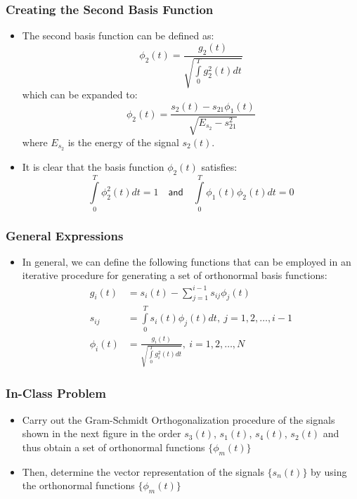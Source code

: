 \documentclass[10pt]{beamer}
\begin{document}
\frame
{
  \frametitle{Creating the Second Basis Function}

    \begin{itemize}
        \item The second basis function can be defined as:
        \begin{equation}
            \phi_2(t)=\frac{g_2(t)}{\sqrt{\int\limits_{0}^{T}g_2^2(t)dt}}
        \end{equation}
        which can be expanded to:
        \begin{equation}
            \phi_2(t)=\frac{s_2(t)-s_{21}\phi_1(t)}{\sqrt{E_{s_2}-s_{21}^2}}
        \end{equation}
        where $E_{s_2}$ is the energy of the signal $s_2(t)$.
        \item It is clear that the basis function $\phi_2(t)$ satisfies:
        \begin{equation}
            \int\limits_0^T\phi_2^2(t)dt=1\quad\mathsf{and}\quad\int\limits_0^T\phi_1(t)\phi_2(t)dt=0\nonumber
        \end{equation}
    \end{itemize}

}

\frame
{
  \frametitle{General Expressions}

    \begin{itemize}
        \item In general, we can define the following functions that can be employed in an iterative procedure for generating a set of orthonormal basis functions:
        \begin{equation}
        \begin{split}
            g_i(t)&=s_i(t)-\sum\limits_{j=1}^{i-1}s_{ij}\phi_j(t)\\
            s_{ij}&=\int\limits_0^Ts_i(t)\phi_j(t)dt,~j=1,2,\ldots,i-1\\
            \phi_i(t)&=\frac{g_i(t)}{\sqrt{\int\limits_0^Tg_i^2(t)dt}},~i=1,2,\ldots,N\nonumber
        \end{split}
        \end{equation}
    \end{itemize}

}




\frame
{
  \frametitle{In-Class Problem}

    \begin{itemize}
        \item Carry out the Gram-Schmidt Orthogonalization procedure of the signals shown in the next figure in the order $s_3(t)$, $s_1(t)$, $s_4(t)$, $s_2(t)$ and thus obtain a set of orthonormal functions $\{\phi_m(t)\}$
        \item Then, determine the vector representation of the signals $\{s_n(t)\}$ by using the orthonormal functions $\{\phi_m(t)\}$
    \end{itemize}

}
\end{document}
